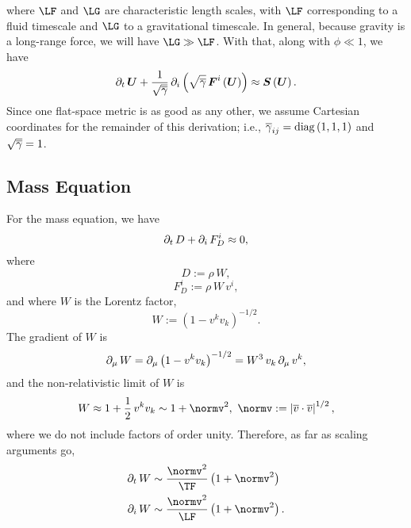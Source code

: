 where $\LF$ and $\LG$ are characteristic length scales, with
$\LF$ corresponding to a fluid timescale and $\LG$ to
a gravitational timescale.
In general, because gravity is a long-range force, we will have
$\LG\gg\LF$.
With that, along with $\phi\ll1$, we have
\begin{equation}
  \partial_{t}\,\boldsymbol{U}
  +\frac{1}{\sqrt{\overline{\gamma}}}\,
  \partial_{i}\left(\sqrt{\overline{\gamma}}\,\boldsymbol{F}^{i}\left(\boldsymbol{U}\right)\right)
  \approx\boldsymbol{S}\left(\boldsymbol{U}\right).
\end{equation}
Since one flat-space metric is as good as any other,
we assume Cartesian coordinates for the remainder of this derivation;
i.e., $\overline{\gamma}_{ij}=\mathrm{diag}\left(1,1,1\right)$ and $\sqrt{\overline{\gamma}}=1$.

\subsection{Mass Equation}

For the mass equation, we have
\begin{equation}
  \partial_{t}\,D+\partial_{i}\,F^{i}_{D}\approx0,
\end{equation}
where
\begin{equation}
  D:=\rho\,W,
\end{equation}
\begin{equation}
  F^{i}_{D}:=\rho\,W\,v^{i},
\end{equation}
and where $W$ is the Lorentz factor,
\begin{equation}
  W:=\left(1-v^{k}v_{k}\right)^{-1/2}.
\end{equation}
The gradient of $W$ is
\begin{equation}
  \partial_{\mu}\,W
  =\partial_{\mu}\left(1-v^{k}v_{k}\right)^{-1/2}
  =W^{3}\,v_{k}\,\partial_{\mu}\,v^{k},
\end{equation}
and the non-relativistic limit of $W$ is
\begin{equation}
  W\approx1+\frac{1}{2}\,v^{k}v_{k}\sim1+\normv^{2},
  \ \normv:=\left|\myol{v}\cdot\myol{v}\right|^{1/2},
\end{equation}
where we do not include factors of order unity.
Therefore, as far as scaling arguments go,
\begin{align}
  \p_{t}\,W&\sim\frac{\normv^{2}}{\TF}\left(1+\normv^{2}\right) \\
  \p_{i}\,W&\sim\frac{\normv^{2}}{\LF}\left(1+\normv^{2}\right).
\end{align}

